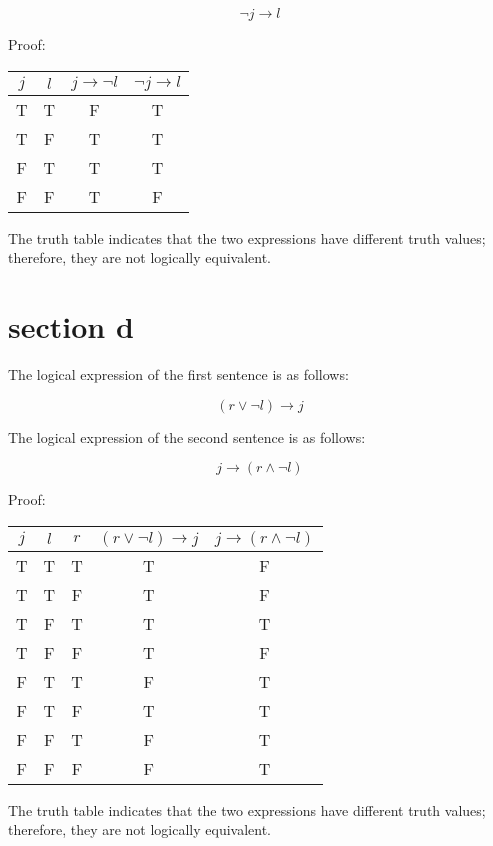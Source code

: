 \documentclass[10pt]{article}
\begin{document}
$$
\neg j \rightarrow l
$$

Proof:

\begin{center}
\begin{tabular}{|c|c|c|c|}
\hline
$j$ & $l$ & $j \rightarrow \neg l$ & $\neg j \rightarrow l$ \\
\hline
T & T & F & T \\
\hline
T & F & T & T \\
\hline
F & T & T & T \\
\hline
F & F & T & F \\
\hline
\end{tabular}
\end{center}

The truth table indicates that the two expressions have different truth values; therefore, they are not logically equivalent.

\section*{section d}
The logical expression of the first sentence is as follows:

$$
(r \vee \neg l) \rightarrow j
$$

The logical expression of the second sentence is as follows:

$$
j \rightarrow(r \wedge \neg l)
$$

Proof:

\begin{center}
\begin{tabular}{|c|c|c|c|c|}
\hline
$j$ & $l$ & $r$ & $(r \vee \neg l) \rightarrow j$ & $j \rightarrow(r \wedge \neg l)$ \\
\hline
T & T & T & T & F \\
\hline
T & T & F & T & F \\
\hline
T & F & T & T & T \\
\hline
T & F & F & T & F \\
\hline
F & T & T & F & T \\
\hline
F & T & F & T & T \\
\hline
F & F & T & F & T \\
\hline
F & F & F & F & T \\
\hline
\end{tabular}
\end{center}

The truth table indicates that the two expressions have different truth values; therefore, they are not logically equivalent.
\end{document}
